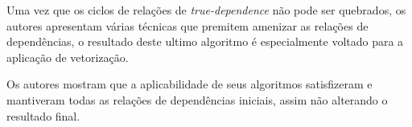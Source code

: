 Uma vez que os ciclos de relações de \textit{true-dependence} não pode ser
quebrados, os autores apresentam várias técnicas que premitem amenizar as
relações de dependências, o resultado deste ultimo algoritmo é especialmente
voltado para a aplicação de vetorização.

Os autores mostram que a aplicabilidade de seus algoritmos satisfizeram e
mantiveram todas as relações de dependências iniciais, assim não alterando o 
resultado final.








